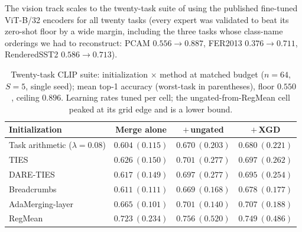 \documentclass{article} %
\begin{document}
The vision track scales to the twenty-task suite of \citet{wang2024tall} using the published fine-tuned ViT-B/32 encoders for all twenty tasks (every expert was validated to beat its zero-shot floor by a wide margin, including the three tasks whose class-name orderings we had to reconstruct: PCAM $0.556\!\to\!0.887$, FER2013 $0.376\!\to\!0.711$, RenderedSST2 $0.586\!\to\!0.713$).


\iffalse
\begin{table}[t]
\centering
\small
\setlength{\tabcolsep}{4pt}
\caption{Twenty-task CLIP suite: initialization $\times$ method at matched budget ($n=64$, $S=5$, single seed); mean top-1 accuracy (worst-task in parentheses), floor $0.550$, ceiling $0.896$. Learning rates tuned per cell; the ungated-from-RegMean cell peaked at its grid edge and is a lower bound.}
\label{tab:clip20matrix}
\footnotesize
\begin{tabular}{lccc}
\toprule
Initialization & Merge alone & $+$\,ungated & $+$\,XGD \\
\midrule
Task arithmetic ($\lambda=0.08$) & $0.604\ (0.115)$ & $0.670\ (0.203)$ & $\mathbf{0.680}\ (0.221)$ \\
TIES                             & $0.626\ (0.150)$ & $\mathbf{0.701}\ (0.277)$ & $0.697\ (0.262)$ \\
DARE-TIES                        & $0.617\ (0.149)$ & $\mathbf{0.697}\ (0.277)$ & $0.695\ (0.254)$ \\
Breadcrumbs                      & $0.611\ (0.111)$ & $0.669\ (0.168)$ & $\mathbf{0.678}\ (0.177)$ \\
AdaMerging-layer                 & $0.665\ (0.101)$ & $0.701\ (0.140)$ & $\mathbf{0.707}\ (0.188)$ \\
RegMean                          & $0.723\ (0.234)$ & $0.756\ (0.520)$ & $0.749\ (0.486)$ \\
\bottomrule
\end{tabular}
\end{table}
\end{document}
